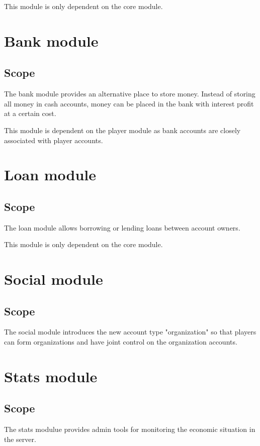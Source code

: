 \documentclass{report}
\begin{document}
			This module is only dependent on the core module.

	\part{Bank module}
		\chapter{Scope}

			The bank module provides an alternative place to store money.
			Instead of storing all money in cash accounts, money can be placed in the bank with interest profit at a certain cost.

			This module is dependent on the player module as bank accounts are closely associated with player accounts.

	\part{Loan module}
		\chapter{Scope}

			The loan module allows borrowing or lending loans between account owners.

			This module is only dependent on the core module.

	\part{Social module}
		\chapter{Scope}

			The social module introduces the new account type "organization" so that players can form organizations
			and have joint control on the organization accounts.

	\part{Stats module}
		\chapter{Scope}

			The stats modulue provides admin tools for monitoring the economic situation in the server.
\end{document}

